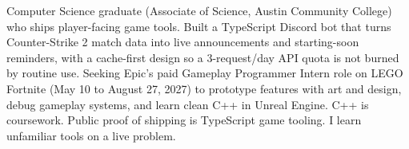 \documentclass[11pt,a4paper,sans]{moderncv}
\begin{document}

\makecvtitle


\vspace{6pt}
\small{Computer Science graduate (Associate of Science, Austin Community College) who ships player-facing game tools. Built a TypeScript Discord bot that turns Counter-Strike 2 match data into live announcements and starting-soon reminders, with a cache-first design so a 3-request/day API quota is not burned by routine use. Seeking Epic's paid Gameplay Programmer Intern role on LEGO Fortnite (May 10 to August 27, 2027) to prototype features with art and design, debug gameplay systems, and learn clean C++ in Unreal Engine. C++ is coursework. Public proof of shipping is TypeScript game tooling. I learn unfamiliar tools on a live problem.}

\end{document}
